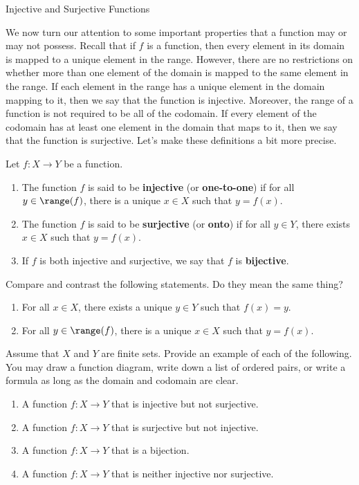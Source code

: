 \begin{section}{Injective and Surjective Functions}

We now turn our attention to some important properties that a function may or may not possess. Recall that if $f$ is a function, then every element in its domain is mapped to a unique element in the range.  However, there are no restrictions on whether more than one element of the domain is mapped to the same element in the range. If each element in the range has a unique element in the domain mapping to it, then we say that the function is injective. Moreover, the range of a function is not required to be all of the codomain.  If every element of the codomain has at least one element in the domain that maps to it, then we say that the function is surjective.  Let's make these definitions a bit more precise.

\begin{definition}
Let $f:X\to Y$ be a function.
\begin{enumerate}[label=\textrm{(\alph*)}]
\item The function $f$ is said to be \textbf{injective} (or \textbf{one-to-one}) if for all $y\in \range(f)$, there is a unique $x\in X$ such that $y=f(x)$.
\item The function $f$ is said to be \textbf{surjective} (or \textbf{onto}) if for all $y\in Y$, there exists $x\in X$ such that $y=f(x)$.
\item If $f$ is both injective and surjective, we say that $f$ is \textbf{bijective}.
\end{enumerate}
\end{definition}

\begin{problem}
Compare and contrast the following statements.  Do they mean the same thing?
\begin{enumerate}[label=\textrm{(\alph*)}]
\item For all $x\in X$, there exists a unique $y\in Y$ such that $f(x)=y$.
\item For all $y\in \range(f)$, there is a unique $x\in X$ such that $y=f(x)$.
\end{enumerate}
\end{problem}

\begin{problem}
Assume that $X$ and $Y$ are finite sets. Provide an example of each of the following.  You may draw a function diagram, write down a list of ordered pairs, or write a formula as long as the domain and codomain are clear. 
\begin{enumerate}[label=\textrm{(\alph*)}]
\item A function $f:X\to Y$ that is injective but not surjective.
\item A function $f:X\to Y$ that is surjective but not injective.
\item A function $f:X\to Y$ that is a bijection.
\item A function $f:X\to Y$ that is neither injective nor surjective.
\end{enumerate}
\end{problem}


\end{section}
